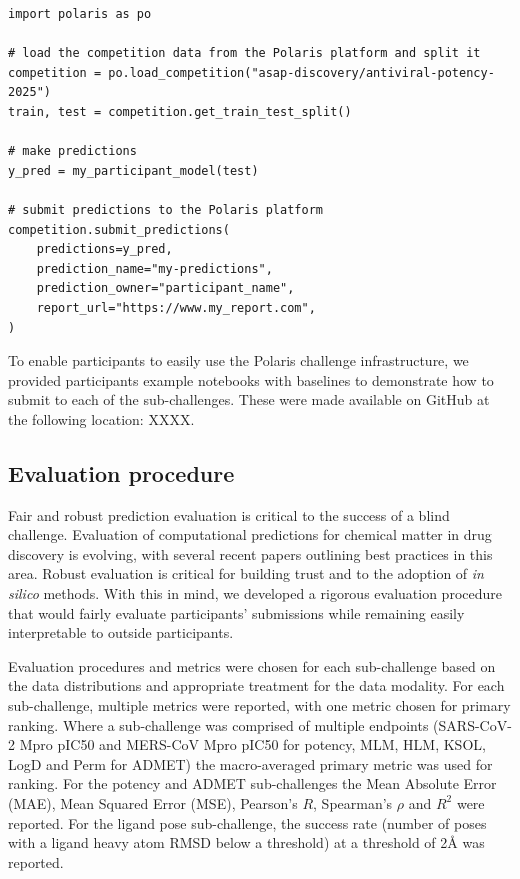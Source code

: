 \documentclass[journal=jcim,manuscript=article]{achemso}
\newenvironment{code}{\captionsetup{type=listing}}{}
\begin{document}
\begin{code}
\label{code:submission}
\begin{verbatim}
import polaris as po

# load the competition data from the Polaris platform and split it
competition = po.load_competition("asap-discovery/antiviral-potency-2025")
train, test = competition.get_train_test_split()

# make predictions
y_pred = my_participant_model(test)

# submit predictions to the Polaris platform
competition.submit_predictions(
    predictions=y_pred,
    prediction_name="my-predictions",
    prediction_owner="participant_name",
    report_url="https://www.my_report.com",
)
\end{verbatim}
\end{code}


To enable participants to easily use the Polaris challenge infrastructure, we provided participants example notebooks with baselines to demonstrate how to submit to each of the sub-challenges. These were made available on GitHub at the following location: XXXX. 

\subsection{Evaluation procedure}    

Fair and robust prediction evaluation is critical to the success of a blind challenge. Evaluation of computational predictions for chemical matter in drug discovery is evolving, with several recent papers outlining best practices in this area.  Robust evaluation is critical for building trust and to the adoption of \textit{ in silico} methods. With this in mind, we developed a rigorous evaluation procedure that would fairly evaluate participants' submissions while remaining easily interpretable to outside participants.

Evaluation procedures and metrics were chosen for each sub-challenge based on the data distributions and appropriate treatment for the data modality. For each sub-challenge, multiple metrics were reported, with one metric chosen for primary ranking. Where a sub-challenge was comprised of multiple endpoints (SARS-CoV-2 Mpro pIC50 and MERS-CoV Mpro pIC50 for potency, MLM, HLM, KSOL, LogD and Perm for ADMET) the macro-averaged primary metric was used for ranking. For the potency and ADMET sub-challenges the Mean Absolute Error (MAE), Mean Squared Error (MSE), Pearson's $R$, Spearman's $\rho$ and $R^2$ were reported. For the ligand pose sub-challenge, the success rate (number of poses with a ligand heavy atom RMSD below a threshold) at a threshold of 2Å was reported.
\end{document}
